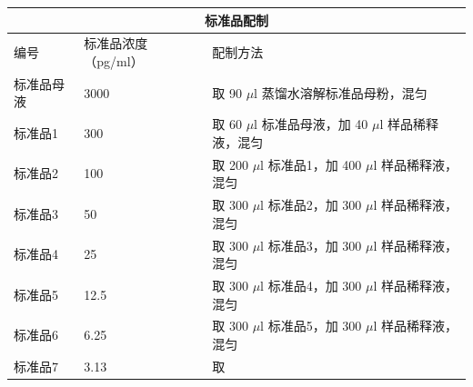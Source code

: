 \documentclass[UTF8,10pt,a4paper,fontset=fandol]{ctexart}
\newcommand{\fieldvalue}[1]{#1}
\newcommand{\handwritten}[1]{#1}
\begin{document}
\begin{tabularx}{\textwidth}{|p{2.5cm}|p{2.5cm}|X|}
\hline
\multicolumn{3}{|c|}{标准品配制} \\
\hline
编号 & 标准品浓度（pg/ml） & 配制方法 \\
\hline
标准品母液 & 3000 &
取
\fieldvalue{\handwritten{90}} $\mu$l 蒸馏水溶解标准品母粉，混匀 \\
\hline
标准品1 & 300 &
取
\fieldvalue{\handwritten{60}} $\mu$l 标准品母液，加
\fieldvalue{\handwritten{40}} $\mu$l 样品稀释液，混匀 \\
\hline
标准品2 & 100 &
取
\fieldvalue{\handwritten{200}} $\mu$l 标准品1，加
\fieldvalue{\handwritten{400}} $\mu$l 样品稀释液，混匀 \\
\hline
标准品3 & 50 &
取
\fieldvalue{\handwritten{300}} $\mu$l 标准品2，加
\fieldvalue{\handwritten{300}} $\mu$l 样品稀释液，混匀 \\
\hline
标准品4 & 25 &
取
\fieldvalue{\handwritten{300}} $\mu$l 标准品3，加
\fieldvalue{\handwritten{300}} $\mu$l 样品稀释液，混匀 \\
\hline
标准品5 & 12.5 &
取
\fieldvalue{\handwritten{300}} $\mu$l 标准品4，加
\fieldvalue{\handwritten{300}} $\mu$l 样品稀释液，混匀 \\
\hline
标准品6 & 6.25 &
取
\fieldvalue{\handwritten{300}} $\mu$l 标准品5，加
\fieldvalue{\handwritten{300}} $\mu$l 样品稀释液，混匀 \\
\hline
标准品7 & 3.13 &
取

\end{tabularx}
\end{document}

